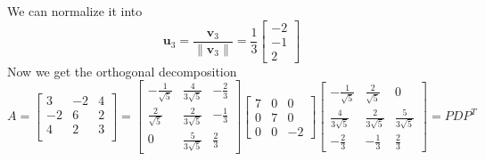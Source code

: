 \documentclass{beamer}
\theoremstyle{definition}
\theoremstyle{remark}
\begin{document}
\begin{frame}[t]
\begin{example}
We can normalize it into
\[
\mathbf u_3=\frac{\mathbf v_3}{\|\mathbf v_3\|}=\frac{1}{3}\begin{bmatrix}
-2\\-1\\2
\end{bmatrix}
\]\pause
Now we get the orthogonal decomposition
\[
A=\begin{bmatrix}
3&-2&4\\
-2&6&2\\
4&2&3\\
\end{bmatrix}=\begin{bmatrix}
-\frac{1}{\sqrt5}&\frac{4}{3\sqrt5}&-\frac{2}{3}\\
\frac{2}{\sqrt5}&\frac{2}{3\sqrt5}&-\frac{1}{3}\\
0&\frac{5}{3\sqrt5}&\frac{2}{3}
\end{bmatrix}\begin{bmatrix}
7&0&0\\
0&7&0\\
0&0&-2
\end{bmatrix}\begin{bmatrix}
-\frac{1}{\sqrt5}&\frac{2}{\sqrt5}&0\\
\frac{4}{3\sqrt5}&\frac{2}{3\sqrt5}&\frac{5}{3\sqrt5}\\
-\frac{2}{3}&-\frac{1}{3}&\frac{2}{3}
\end{bmatrix}=PDP^T
\]
\end{example}
\end{frame}
\end{document}
